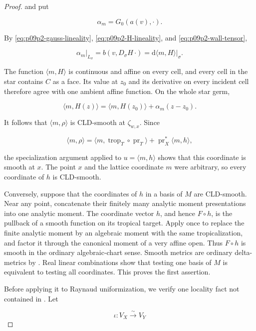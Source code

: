 \begin{proof}
and put

\[
                         \alpha_m=G_0(a(v),\mathord\cdot).
\]

By \eqref{eq:p09p2-gauss-lineality}, \eqref{eq:p09p2-H-lineality}, and
\eqref{eq:p09p2-wall-tensor},

\[
 \left.\alpha_m\right|_{L_\sigma}
   =b(v,D_\sigma H\,\mathord\cdot)
   =\left.\mathrm d\langle m,H\rangle\right|_\sigma.
\]

The function \(\langle m,H\rangle\) is continuous and affine on every
cell, and every cell in the star contains \(C\) as a face.  Its value at
\(z_0\) and its derivative on every incident cell therefore agree with one
ambient affine function.  On the whole star germ,

\begin{equation}
\label{eq:p09p2-affine-coordinate}
 \langle m,H(z)\rangle
  =\langle m,H(z_0)\rangle+\alpha_m(z-z_0).
\end{equation}

It follows that \(\langle m,\rho\rangle\) is CLD-smooth at
\(\zeta_{w,x}\).  Since

\[
 \langle m,\rho\rangle
 =\langle m,\operatorname{trop}_T\circ\operatorname{pr}_T\rangle
    +\operatorname{pr}_X^*\langle m,h\rangle,
\]

the specialization argument applied to
\(u=\langle m,h\rangle\) shows that this coordinate is smooth at \(x\).
The point \(x\) and the lattice coordinate \(m\) were arbitrary, so every
coordinate of \(h\) is CLD-smooth.

Conversely, suppose that the coordinates of \(h\) in a basis of \(M\) are
CLD-smooth.  Near any point, concatenate their finitely many analytic
moment presentations into one analytic moment.  The coordinate vector
\(h\), and hence \(F\circ h\), is the pullback of a smooth function on its
tropical target.  Apply \cite[Proposition~7.2]{Gub16} once to replace the
finite analytic moment by an algebraic moment with the same
tropicalization, and factor it through the canonical moment of a very
affine open.  Thus \(F\circ h\) is smooth in the ordinary algebraic-chart
sense.  Smooth metrics are ordinary delta-metrics by
\cite[Remark~9.16]{GK17}.  Real linear combinations show that testing one
basis of \(M\) is equivalent to testing all coordinates.  This proves the
first assertion.

Before applying it to Raynaud uniformization, we verify one locality fact
not contained in \cite[Proposition~9.15]{GK17}.  Let

\[
                 \iota:V_X\xrightarrow{\sim}V_Y
\]


\end{proof}
